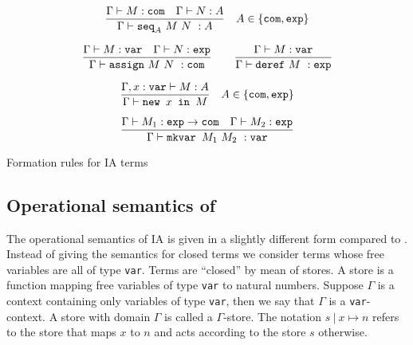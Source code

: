 \begin{table}[htbp]
$$ \frac{\displaystyle \Gamma \vdash M : \texttt{com} \quad \Gamma \vdash N :A}{\Gamma \vdash \texttt{seq}_A \ M\ N\ : A} \quad A \in \{ \texttt{com}, \texttt{exp}\}$$

$$ \frac{\displaystyle \Gamma \vdash M : \texttt{var} \quad \Gamma \vdash N : \texttt{exp}}{\Gamma \vdash \texttt{assign}\ M\ N\ : \texttt{com}}
\qquad
 \frac{\displaystyle \Gamma \vdash M : \texttt{var}}{\Gamma \vdash \texttt{deref}\ M\ : \texttt{exp}}$$

$$ \frac{\displaystyle \Gamma, x : \texttt{var} \vdash M : A}{\Gamma \vdash \texttt{new } x \texttt{ in } M} \quad A \in \{ \texttt{com}, \texttt{exp}\}$$

$$ \frac{\displaystyle \Gamma \vdash M_1 : \texttt{exp} \rightarrow \texttt{com} \quad \Gamma \vdash M_2 : \texttt{exp}}{\Gamma \vdash \texttt{mkvar } M_1\ M_2\ : \texttt{var}}$$

\caption{Formation rules for IA terms}
\label{tab:ia_formrules}
\end{table}


\subsection{Operational semantics of \ialgol}

The operational semantics of IA is given in a slightly different form compared to \pcf.
Instead of giving the semantics for closed terms we consider terms
whose free variables are all of type \texttt{var}. Terms are
``closed'' by mean of stores. A store is a function mapping free
variables of type \texttt{var} to natural numbers. Suppose $\Gamma$
is a context containing only variables of type \texttt{var}, then we
say that $\Gamma$ is a \texttt{var}-context. A store with domain
$\Gamma$ is called a $\Gamma$-store. The notation $s\ |\ x \mapsto
n$ refers to the store that maps $x$ to $n$ and acts according to the store $s$ otherwise.

%


